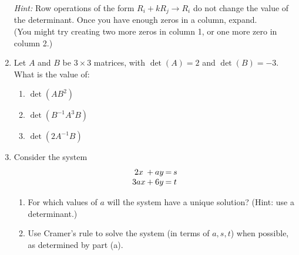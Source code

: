 \documentclass[12pt]{article}
\begin{document}
\begin{enumerate}
\textit{Hint:} Row operations of the form $R_i+kR_j\to R_i$ do not change the value of the determinant. Once you have enough zeros in a column, expand.\\ (You might try creating two more zeros in column 1, or one more zero in column 2.)
 
 \newpage
 
 \item Let $A$ and $B$ be $3\times 3$ matrices, with $\det(A)=2$ and $\det(B)=-3$. What is the value of:
 \begin{enumerate}
 \item $\det(AB^2)$
 
 \vspace{0.5in}
 
 \item $\det(B^{-1}A^3B)$
 
 \vspace{0.5in}
 
 \item $\det(2A^{-1}B)$
 
 \vspace{1in}
 
 
\end{enumerate}
\item Consider the system
\[\arraycolsep=1pt
\begin{array}{ccccc}
2x&+&ay&=&s\\
3ax&+&6y&=&t
\end{array}
\]
\begin{enumerate}
\item For which values of $a$ will the system have a unique solution? (Hint: use a determinant.)

\vspace{1in}

\item Use Cramer's rule to solve the system (in terms of $a,s,t$) when possible, as determined by part (a).
\end{enumerate}

 \end{enumerate}
\end{document}
